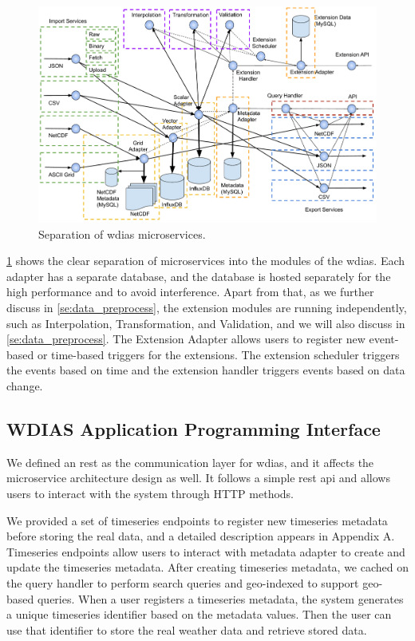 \begin{figure}[htp]
    \centering
    \includegraphics[width=1\textwidth]{method/microservice/separation_microservices-v4.pdf}
    \caption{Separation of \acrshort{wdias} microservices.}
    \label{fi:wdias_micro_separation}
\end{figure}

\cref{fi:wdias_micro_separation} shows the clear separation of microservices into the modules of the \acrshort{wdias}. Each adapter has a separate database, and the database is hosted separately for the high performance and to avoid interference.
Apart from that, as we further discuss in \cref{se:data_preprocess}, the extension modules are running independently, such as Interpolation, Transformation, and Validation, and we will also discuss in \cref{se:data_preprocess}. The Extension Adapter allows users to register new event-based or time-based triggers for the extensions. The extension scheduler triggers the events based on time and the extension handler triggers events based on data change.


\subsection{WDIAS Application Programming Interface}
\label{sebse:wdias_api}

We defined an \acrshort{rest} as the communication layer for \acrshort{wdias}, and it affects the microservice architecture design as well. It follows a simple \acrshort{rest} \acrshort{api} and allows users to interact with the system through HTTP methods.

We provided a set of timeseries endpoints to register new timeseries metadata before storing the real data, and a detailed description appears in Appendix A. Timeseries endpoints allow users to interact with metadata adapter to create and update the timeseries metadata. After creating timeseries metadata, we cached on the query handler to perform search queries and geo-indexed to support geo-based queries. When a user registers a timeseries metadata, the system generates a unique timeseries identifier based on the metadata values. Then the user can use that identifier to store the real weather data and retrieve stored data.

